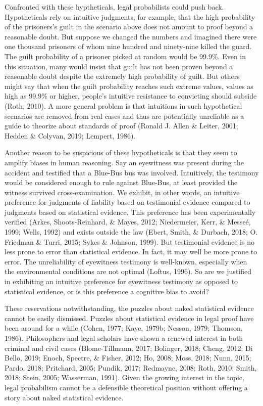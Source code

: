 \documentclass[
  10pt,
  dvipsnames,enabledeprecatedfontcommands]{scrartcl}
\begin{document}
Confronted with these hyptheticals, legal probabilists could push back.
Hypotheticals rely on intuitive judgments, for example, that the high
probability of the prisoners's guilt in the scenario above does not
amount to proof beyond a reasonable doubt. But suppose we changed the
numbers and imagined there were one thousand prisoners of whom nine
hundred and ninety-nine killed the guard. The guilt probability of a
prisoner picked at random would be 99.9\%. Even in this situation, many
would insist that guilt has not been proven beyond a reasonable doubt
despite the extremely high probability of guilt. But others might say
that when the guilt probability reaches such extreme values, values as
high as 99.9\% or higher, people's intuitive resistance to convicting
should subside (Roth, 2010). A more general problem is that intuitions
in such hypothetical scenarios are removed from real cases and thus are
potentially unreliable as a guide to theorize about standards of proof
(Ronald J. Allen \& Leiter, 2001; Hedden \& Colyvan, 2019; Lempert,
1986).

Another reason to be suspicious of these hypotheticals is that they seem
to amplify biases in human reasoning. Say an eyewitness was present
during the accident and testified that a Blue-Bus bus was involved.
Intuitively, the testimony would be considered enough to rule against
Blue-Bus, at least provided the witness survived cross-examination. We
exhibit, in other words, an intuitive preference for judgments of
liability based on testimonial evidence compared to judgments based on
statistical evidence. This preference has been experimentally verified
(Arkes, Shoots-Reinhard, \& Mayes, 2012; Niedermeier, Kerr, \& Messeé,
1999; Wells, 1992) and exists outside the law (Ebert, Smith, \& Durbach,
2018; O. Friedman \& Turri, 2015; Sykes \& Johnson, 1999). But
testimonial evidence is no less prone to error than statistical
evidence. In fact, it may well be more prone to error. The unreliability
of eyewitness testimony is well-known, especially when the environmental
conditions are not optimal (Loftus, 1996). So are we justified in
exhibiting an intuitive preference for eyewitness testimony as opposed
to statistical evidence, or is this preference a cognitive bias to
avoid?

These reservations notwithstanding, the puzzles about naked statistical
evidence cannot be easily dismissed. Puzzles about statistical evidence
in legal proof have been around for a while (Cohen, 1977; Kaye, 1979b;
Nesson, 1979; Thomson, 1986). Philosophers and legal scholars have shown
a renewed interest in both criminal and civil cases (Blome-Tillmann,
2017; Bolinger, 2018; Cheng, 2012; Di Bello, 2019; Enoch, Spectre, \&
Fisher, 2012; Ho, 2008; Moss, 2018; Nunn, 2015; Pardo, 2018; Pritchard,
2005; Pundik, 2017; Redmayne, 2008; Roth, 2010; Smith, 2018; Stein,
2005; Wasserman, 1991). Given the growing interest in the topic, legal
probabilism cannot be a defensible theoretical position without offering
a story about naked statistical evidence.
\end{document}
